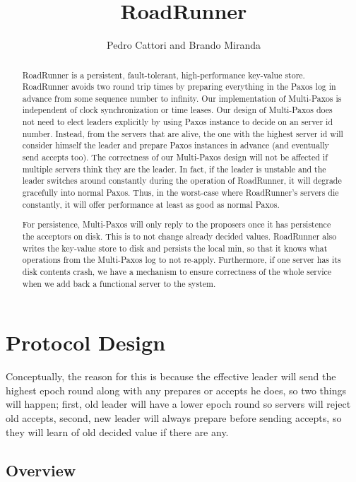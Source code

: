 \documentclass[a4paper]{article}
\title{RoadRunner}
\author{Pedro Cattori and Brando Miranda}
\begin{document}
\maketitle

\begin{abstract}
RoadRunner is a persistent, fault-tolerant, high-performance key-value store. 
RoadRunner avoids two round trip times by preparing everything in the Paxos log in advance from some sequence number to infinity. 
Our implementation of Multi-Paxos is independent of clock synchronization or time leases.
Our design of Multi-Paxos does not need to elect leaders explicitly by using Paxos instance to decide on an server id number.
Instead, from the servers that are alive, the one with the highest server id will consider himself the leader and prepare Paxos instances in advance (and eventually send accepts too).
The correctness of our Multi-Paxos design will not be affected if multiple servers think they are the leader. 
In fact, if the leader is unstable and the leader switches around constantly during the operation of RoadRunner, it will degrade gracefully into normal Paxos. 
Thus, in the worst-case where RoadRunner's servers die constantly, it will offer performance at least as good as normal Paxos.

\indent For persistence, Multi-Paxos will only reply to the proposers once it has persistence the acceptors on disk. This is to not change already decided values. 
RoadRunner also writes the key-value store to disk and persists the local min, so that it knows what operations from the Multi-Paxos log to not re-apply. 
Furthermore, if one server has its disk contents crash, we have a mechanism to ensure correctness of the whole service when we add back a functional server to the system.
\end{abstract}

\section{Protocol Design}

Conceptually, the reason for this is because the effective leader will send the highest epoch round along with any prepares or accepts he does, so two things will happen; first, old leader will have a lower epoch round so servers will reject old accepts, second, new leader will always prepare before sending accepts, so they will learn of old decided value if there are any. 


\subsection{Overview}
\end{document}
